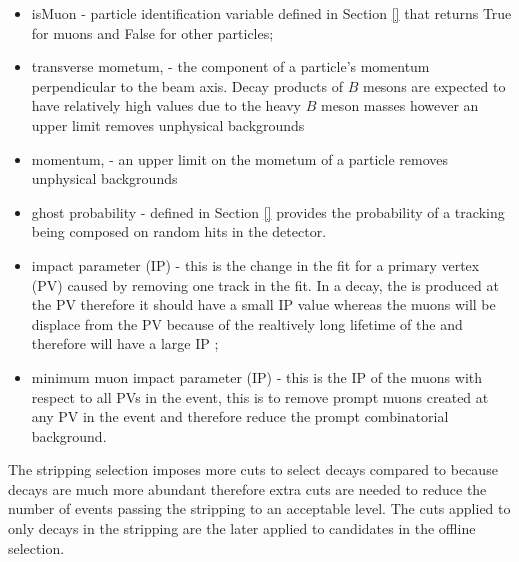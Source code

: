 \begin{itemize}
\item isMuon - particle identification variable defined in Section \ref{} that returns True for muons and False for other particles;
\item transverse mometum, \pt - the component of a particle's momentum perpendicular to the beam axis. Decay products of $B$ mesons are expected to have relatively high \pt values due to the heavy $B$ meson masses however an upper limit removes unphysical backgrounds
\item momentum, \p - an upper limit on the mometum of a particle  removes unphysical backgrounds
\item ghost probability - defined in Section \ref{} provides the probability of a tracking being composed on random hits in the detector.
\item impact parameter (IP) \chisqd - this is the change in the fit for a primary vertex (PV) caused by removing one track in the fit. In a \bsmumu decay, the \bs is produced at the PV therefore it should have a small IP \chisqd value whereas the muons will be displace from the PV because of the realtively long lifetime of the \bs and therefore will have a large IP \chisqd;
\item minimum muon impact parameter (IP) \chisqd - this is the IP \chisqd of the muons with respect to all PVs in the event, this is to remove prompt muons created at any PV in the event and therefore reduce the prompt combinatorial background. 
\end{itemize}

The stripping selection imposes more cuts to select \bhh decays compared to \bsmumu because \bhh decays are much more abundant therefore extra cuts are needed to reduce the number of events passing the stripping to an acceptable level. The cuts applied to only \bhh decays in the stripping are the later applied to \bsmumu candidates in the offline selection. 

